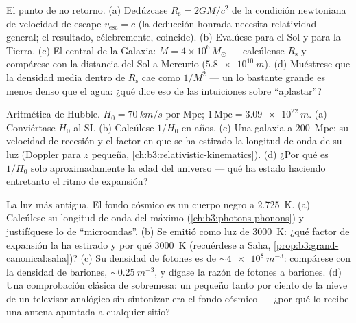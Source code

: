 \begin{exercise}[$\star\star$]\label{exo:b3:astrophysics:8}
El punto de no retorno. (a) Dedúzcase $R_{\text{s}} = 2GM/c^2$ de
la condición newtoniana de velocidad de escape $v_{\text{esc}} = c$ (la
deducción honrada necesita relatividad general; el resultado,
célebremente, coincide). (b) Evalúese para el Sol y para la Tierra.
(c) El  central de la Galaxia: $M = 4\times10^6\,M_\odot$
--- calcúlense $R_{\text{s}}$ y compárese con la distancia
del Sol a Mercurio ($\qty{5.8e10}{m}$). (d) Muéstrese que la densidad media dentro de
$R_{\text{s}}$ cae como $1/M^2$ --- un  lo bastante grande es
menos denso que el agua: ¿qué dice eso de las intuiciones
sobre ``aplastar''?
\end{exercise}

\begin{exercise}[$\star\star\star$]\label{exo:b3:astrophysics:9}
Aritmética de Hubble. $H_0 = \qty{70}{km/s}$ por Mpc; $1\,
\text{Mpc} = \qty{3.09e22}{m}$. (a) Conviértase $H_0$ al SI. (b)
Calcúlese $1/H_0$ en años. (c) Una galaxia a \qty{200}{Mpc}: su
velocidad de recesión y el factor en que se ha estirado la longitud de onda
de su luz (Doppler para $z$ pequeña,
\cref{ch:b3:relativistic-kinematics}). (d) ¿Por qué es $1/H_0$ solo
aproximadamente la edad del universo --- qué ha estado haciendo entretanto el
ritmo de expansión?
\end{exercise}

\begin{exercise}[$\star\star\star$]\label{exo:b3:astrophysics:10}
La luz más antigua. El fondo cósmico es un cuerpo negro a \qty{2.725}{K}. (a)
Calcúlese su longitud de onda del máximo (\cref{ch:b3:photons-phonons}) y
justifíquese lo de ``microondas''. (b) Se emitió como luz de
\qty{3000}{K}: ¿qué factor de expansión la ha estirado
y por qué \qty{3000}{K} (recuérdese a Saha,
\cref{prop:b3:grand-canonical:saha})? (c) Su densidad de fotones es de
$\sim\qty{4e8}{m^{-3}}$: compárese con la densidad de bariones,
$\sim\qty{0.25}{m^{-3}}$, y dígase la razón de fotones a bariones.
(d) Una comprobación clásica de sobremesa: un pequeño tanto por ciento de la nieve de un
televisor analógico sin sintonizar era el fondo cósmico --- ¿por qué lo recibe una antena
apuntada a cualquier sitio?
\end{exercise}

